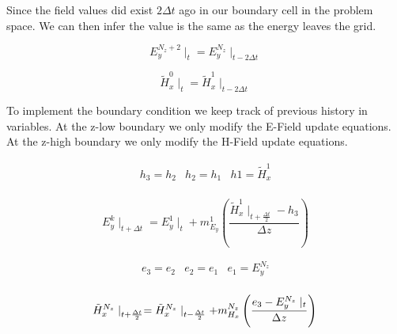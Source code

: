 \documentclass[a4paper,10pt]{article}
\begin{document}
Since the field values did exist $2\Delta t$ ago in our boundary cell in the problem space.  We can then infer the value is the same as the energy leaves the grid.

\begin{equation*}
  E_y^{N_z + 2}\mid_{t} = E_y^{N_z}\mid_{t-2\Delta t}
\end{equation*}

\begin{equation*}
 \tilde{H}_{x}^{0}\mid_{t} = \tilde{H}_{x}^{1}\mid_{t-2\Delta t}
\end{equation*}

To implement the boundary condition we keep track of previous history in variables.  At the z-low boundary we only modify the E-Field update equations.  At the z-high boundary we only modify the H-Field update equations.


\begin{eqnarray*}
  h_3 = h_2 & h_2 = h_1 & h1 = \tilde{H}_{x}^{1}\\
\end{eqnarray*}

\begin{equation*}
   E_{y}^{k}\mid_{t+\Delta t} = E_{y}^{1}\mid_{t} + m_{E_y}^{1}\left(\frac{\tilde{H}_{x}^{1}\mid_{t+\frac{\Delta t}{2}} - h_3 }{\Delta z}\right)
\end{equation*}


\begin{eqnarray*}
  e_3 = e_2 & e_2 = e_1 & e_1 = E_y^{N_z}\\
\end{eqnarray*}

\begin{equation*}
   \tilde{H}_{x}^{N_z}\mid_{t+\frac{\Delta t}{2}} = \tilde{H}_{x}^{N_z}\mid_{t-\frac{\Delta t}{2}} + m_{H_x}^{N_z}\left(\frac{e_3 - E_{y}^{N_z}\mid_{t}}{\Delta z}\right)\\
\end{equation*}
\end{document}
